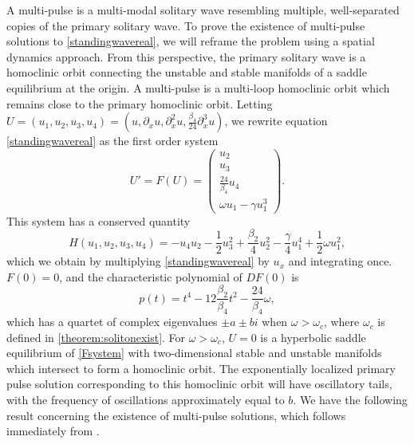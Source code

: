 \documentclass[12pt]{elsarticle}
\begin{document}
A multi-pulse is a multi-modal solitary wave resembling multiple, well-separated copies of the primary solitary wave. To prove the existence of multi-pulse solutions to \cref{standingwavereal}, we will reframe the problem using a spatial dynamics approach. From this perspective, the primary solitary wave is a homoclinic orbit connecting the unstable and stable manifolds of a saddle equilibrium at the origin. A multi-pulse is a multi-loop homoclinic orbit which remains close to the primary homoclinic orbit. Letting $U = (u_1, u_2, u_3, u_4) = (u, \partial_x u, \partial_x^2 u, \frac{\beta_4}{24} \partial_x^3 u)$, we rewrite equation \cref{standingwavereal} as the first order system
\begin{equation}\label{Fsystem}
U' = F(U) = \begin{pmatrix}
u_2 \\ u_3 \\ \frac{24}{\beta_4} u_4 \\ \omega u_1 - \gamma u_1^3
\end{pmatrix}.
\end{equation}
This system has a conserved quantity
\begin{equation}\label{FsystemH}
H(u_1, u_2, u_3, u_4) = -u_4 u_2 - \frac{1}{2} u_3^2 + \frac{\beta_2}{4}u_2^2 - \frac{\gamma}{4} u_1^4 + \frac{1}{2}\omega u_1^2,
\end{equation}
which we obtain by multiplying \cref{standingwavereal} by $u_x$ and integrating once. $F(0) = 0$, and the characteristic polynomial of $DF(0)$ is
\[
p(t) = t^4 - 12\frac{\beta_2}{\beta_4} t^2 - \frac{24}{\beta_4}\omega,
\]
which has a quartet of complex eigenvalues $\pm a \pm b i$ when $\omega > \omega_c$, where $\omega_c$ is defined in \cref{theorem:solitonexist}. For $\omega > \omega_c$, $U = 0$ is a hyperbolic saddle equilibrium of \cref{Fsystem} with two-dimensional stable and unstable manifolds which intersect to form a homoclinic orbit. The exponentially localized primary pulse solution corresponding to this homoclinic orbit will have oscillatory tails, with the frequency of oscillations approximately equal to $b$. We have the following result concerning the existence of multi-pulse solutions, which follows immediately from \cite[Theorem~3.6]{SandstedeStrut}. 
\end{document}
